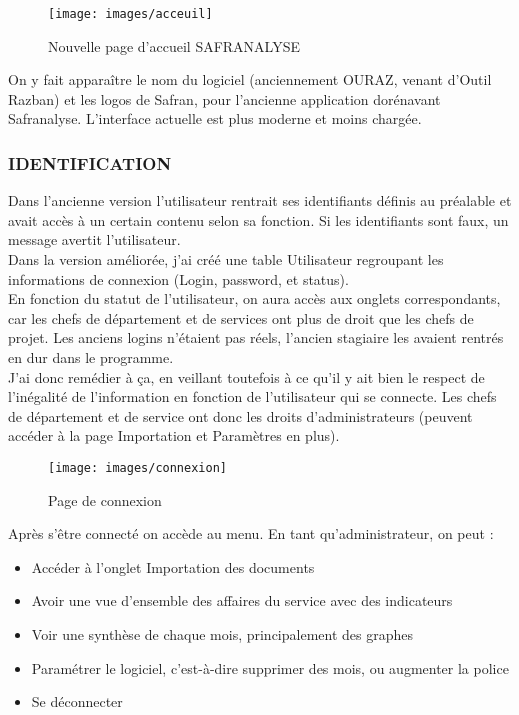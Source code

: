 \begin{figure}[!h]
\begin{center}
\texttt{[image: images/acceuil]}
\end{center}
\caption{Nouvelle page d'accueil SAFRANALYSE}
\end{figure}


On y fait apparaître le nom du logiciel (anciennement OURAZ, venant d’Outil Razban) et les logos de Safran, pour l’ancienne application dorénavant Safranalyse. L’interface actuelle est plus moderne et moins chargée. 

\subsubsection{IDENTIFICATION}
Dans l’ancienne version l’utilisateur rentrait ses identifiants définis au préalable et avait accès à un certain contenu selon sa fonction. Si les identifiants sont faux, un message avertit l’utilisateur.\\ 

Dans la version améliorée, j’ai créé une table Utilisateur regroupant les informations de connexion (Login, password, et status).\\ 
En fonction du statut de l’utilisateur, on aura accès aux onglets correspondants, car les chefs de département et de services ont plus de droit que les chefs de projet. Les anciens logins n’étaient pas réels, l’ancien stagiaire les avaient rentrés en dur dans le programme.\\
J’ai donc remédier à ça, en veillant toutefois à ce qu’il y ait bien le respect de l’inégalité de l’information en fonction de l’utilisateur qui se connecte. Les chefs de département et de service ont donc les droits d’administrateurs (peuvent accéder à la page Importation et Paramètres en plus).\\


\begin{figure}[!h]
\begin{center}
\texttt{[image: images/connexion]}
\end{center}
\caption{Page de connexion}
\end{figure}


Après s’être connecté on accède au menu. En tant qu’administrateur, on peut :\\
\begin{itemize}
\item Accéder à l’onglet Importation des documents
\item Avoir une vue d’ensemble des affaires du service avec des indicateurs
\item Voir une synthèse de chaque mois, principalement des graphes
\item Paramétrer le logiciel, c’est-à-dire supprimer des mois, ou augmenter la police
\item Se déconnecter
\end{itemize}	

